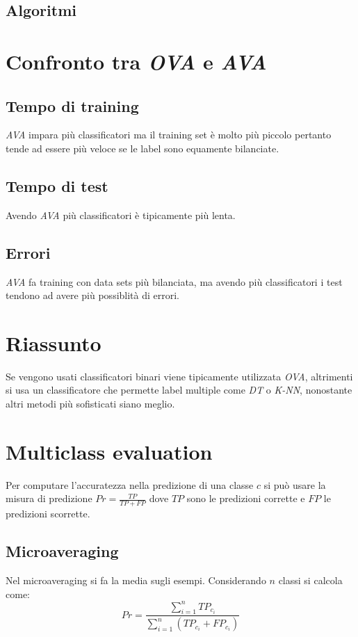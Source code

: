 	\subsection{Algoritmi}
	
	

\section{Confronto tra \emph{OVA} e \emph{AVA}}

	\subsection{Tempo di training}
	\emph{AVA} impara pi\`u classificatori ma il training set \`e molto pi\`u piccolo pertanto tende ad essere pi\`u veloce se le label sono equamente bilanciate.

	\subsection{Tempo di test}
	Avendo \emph{AVA} pi\`u classificatori \`e tipicamente pi\`u lenta.

	\subsection{Errori}
	\emph{AVA} fa training con data sets pi\`u bilanciata, ma avendo pi\`u classificatori i test tendono ad avere pi\`u possiblit\`a di errori.

\section{Riassunto}
Se vengono usati classificatori binari viene tipicamente utilizzata  \emph{OVA}, altrimenti si usa un classificatore che permette label multiple come \emph{DT} o \emph{K-NN}, nonostante altri metodi pi\`u sofisticati siano meglio.

\section{Multiclass evaluation}
Per computare l'accuratezza nella predizione di una classe $c$ si pu\`o usare la misura di predizione $Pr=\frac{TP}{TP+FP}$ dove $TP$ sono le predizioni corrette e $FP$ le predizioni scorrette.

	\subsection{Microaveraging}
	Nel microaveraging si fa la media sugli esempi.
	Considerando $n$ classi si calcola come:
	$$Pr=\dfrac{\sum\limits_{i=1}^nTP_{c_i}}{\sum\limits_{i=1}^n(TP_{c_i}+FP_{c_i})}$$

